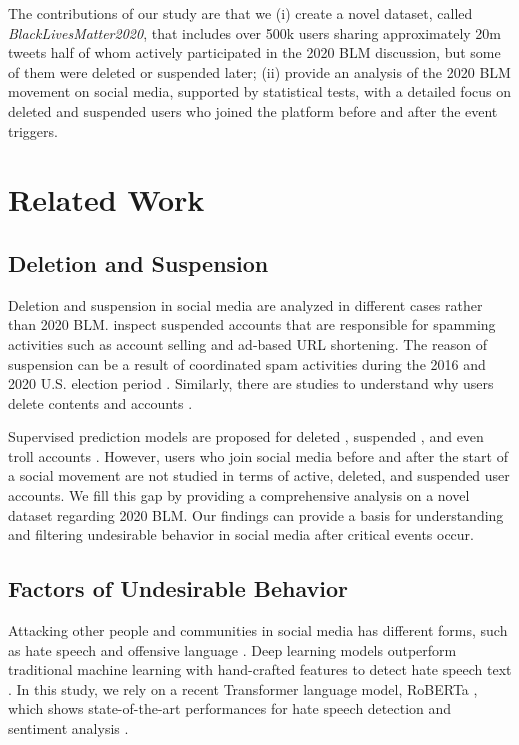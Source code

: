 \documentclass[sigconf]{acmart}
\begin{document}
The contributions of our study are that we (i) create a novel dataset, called \emph{BlackLivesMatter2020}, that includes over 500k users sharing approximately 20m tweets half of whom actively participated in the 2020 BLM discussion, but some of them were deleted or suspended later; (ii) provide an analysis of the 2020 BLM movement on social media, supported by statistical tests, with a detailed focus on deleted and suspended users who joined the platform before and after the event triggers. 

\section{Related Work}

\subsection{Deletion and Suspension}
Deletion and suspension in social media are analyzed in different cases rather than 2020 BLM. \citet{Thomas:2011} inspect suspended accounts that are responsible for spamming activities such as account selling and ad-based URL shortening. The reason of suspension can be a result of coordinated spam activities during the 2016 and 2020 U.S. election period \cite{Le:2019,Chowdhury:2021}. Similarly, there are studies to understand why users delete contents and accounts \cite{Zhou:2016}.

Supervised prediction models are proposed for deleted \cite{Zhou:2016}, suspended \cite{Volkova:2017,Seyler:2021}, and even troll accounts \cite{Im:2020}. However, users who join social media before and after the start of a social movement are not studied in terms of active, deleted, and suspended user accounts. We fill this gap by providing a comprehensive analysis on a novel dataset regarding 2020 BLM. Our findings can provide a basis for understanding and filtering undesirable behavior in social media after critical events occur.

\subsection{Factors of Undesirable Behavior}
Attacking other people and communities in social media has different forms, such as hate speech and offensive language \cite{Silva:2016, Basile:2019, Davidson:2019}. Deep learning models outperform traditional machine learning with hand-crafted features to detect hate speech text \cite{Cao:2020,Caselli:2021}. In this study, we rely on a recent Transformer language model, RoBERTa \cite{Liu:2019}, which shows state-of-the-art performances for hate speech detection \cite{Zampieri:2020} and sentiment analysis \cite{Barbieri:2020}.
\end{document}
